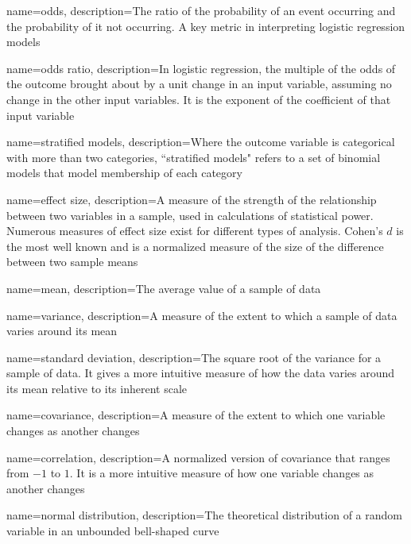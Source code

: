 {
    name={odds},
    description={The ratio of the probability of an event occurring and the probability of it not occurring.  A key metric in interpreting logistic regression models}
}

{
    name={odds ratio},
    description={In logistic regression, the multiple of the odds of the outcome brought about by a unit change in an input variable, assuming no change in the other input variables.  It is the exponent of the coefficient of that input variable}
}

{
    name={stratified models},
    description={Where the outcome variable is categorical with more than two categories, ``stratified models" refers to a set of binomial models that model membership of each category}
}

{
    name={effect size},
    description={A measure of the strength of the relationship between two variables in a sample, used in calculations of statistical power.  Numerous measures of effect size exist for different types of analysis.  Cohen's $d$ is the most well known and is a normalized measure of the size of the difference between two sample means}
}

{
    name={mean},
    description={The average value of a sample of data}
}

{
    name={variance},
    description={A measure of the extent to which a sample of data varies around its mean}
}

{
    name={standard deviation},
    description={The square root of the variance for a sample of data.  It gives a more intuitive measure of how the data varies around its mean relative to its inherent scale}
}

{
    name={covariance},
    description={A measure of the extent to which one variable changes as another changes}
}

{
    name={correlation},
    description={A normalized version of covariance that ranges from $-1$ to $1$.  It is a more intuitive measure of how one variable changes as another changes}
}

{
    name={normal distribution},
    description={The theoretical distribution of a random variable in an unbounded bell-shaped curve}
}

